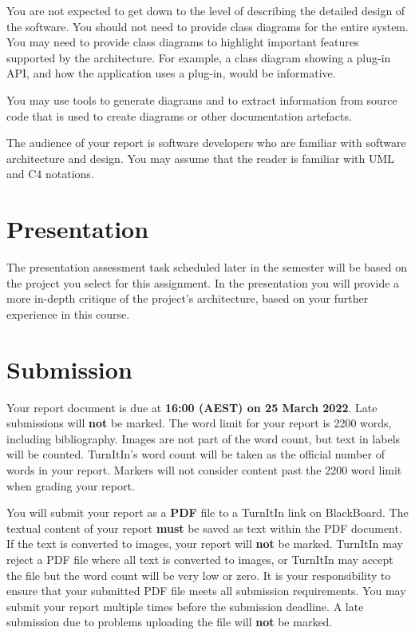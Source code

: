 \documentclass{csse4400}
\begin{document}
You are not expected to get down to the level of describing the detailed design of the software.
You should not need to provide class diagrams for the entire system.
You may need to provide class diagrams to highlight important features supported by the architecture.
For example, a class diagram showing a plug-in API, and how the application uses a plug-in, would be informative.

You may use tools to generate diagrams and to extract information from source code that is used to create diagrams or other documentation artefacts.

The audience of your report is software developers who are familiar with software architecture and design.
You may assume that the reader is familiar with UML and C4 notations.


\section{Presentation}
The presentation assessment task scheduled later in the semester will be based on the project you select for this assignment.
In the presentation you will provide a more in-depth critique of the project's architecture, based on your further experience in this course.


\section{Submission}
Your report document is due at \textbf{16:00 (AEST) on 25 March 2022}. Late submissions will \textbf{not} be marked.
The word limit for your report is 2200 words, including bibliography.
Images are not part of the word count, but text in labels will be counted.
TurnItIn's word count will be taken as the official number of words in your report.
Markers will not consider content past the 2200 word limit when grading your report.

You will submit your report as a \textbf{PDF} file to a TurnItIn link on BlackBoard.
The textual content of your report \textbf{must} be saved as text within the PDF document.
If the text is converted to images, your report will \textbf{not} be marked.
TurnItIn may reject a PDF file where all text is converted to images, or
TurnItIn may accept the file but the word count will be very low or zero.
It is your responsibility to ensure that your submitted PDF file meets all submission requirements.
You may submit your report multiple times before the submission deadline.
A late submission due to problems uploading the file will \textbf{not} be marked.
\end{document}
